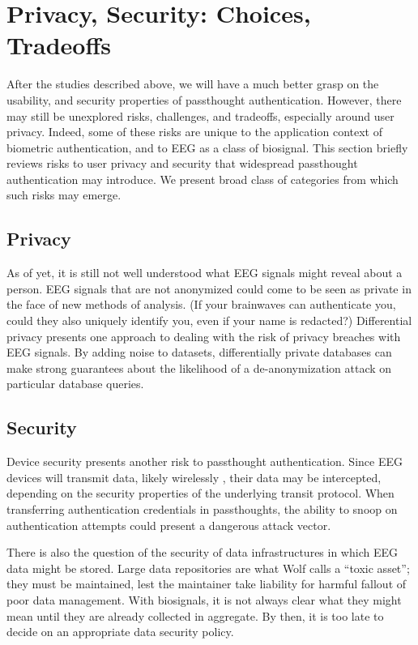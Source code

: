 \documentclass[sigconf]{acmart}
\begin{document}
\section{Privacy, Security: Choices, Tradeoffs}
\label{sec:orgb8a670d}

After the studies described above, we will have a much better grasp on the
usability, and security properties of passthought authentication. However, there
may still be unexplored risks, challenges, and tradeoffs, especially around user
privacy. Indeed, some of these risks are unique to the application context of
biometric authentication, and to EEG as a class of biosignal. This section
briefly reviews risks to user privacy and security that widespread passthought
authentication may introduce. We present broad class of categories from which
such risks may emerge.

\subsection{Privacy}
\label{sec:org3367374}
As of yet, it is still not well understood what EEG signals might reveal about a person.
EEG signals that are not anonymized could come to be seen as private in the face of new methods of analysis.
(If your brainwaves can authenticate you, could they also uniquely identify you, even if your name is redacted?)
Differential privacy \cite{Dwork2014} presents one approach to dealing with the risk of privacy breaches with EEG signals.
By adding noise to datasets, differentially private databases can make strong guarantees about the likelihood of a de-anonymization attack on particular database queries.

\subsection{Security}
\label{sec:org1e5fa6b}
Device security presents another risk to passthought authentication.
Since EEG devices will transmit data, likely wirelessly \cite{Mihajlovic2015}, their data may be intercepted, depending on the security properties of the underlying transit protocol. 
When transferring authentication credentials in passthoughts, the ability to snoop on authentication attempts could present a dangerous attack vector.

There is also the question of the security of data infrastructures in which EEG data might be stored.
Large data repositories are what Wolf \cite{Wolf2010} calls a ``toxic asset''; they must be maintained, 
lest the maintainer take liability for harmful fallout of poor data management.
With biosignals, it is not always clear what they might mean until they are already collected in aggregate. 
By then, it is too late to decide on an appropriate data security policy.
\end{document}
